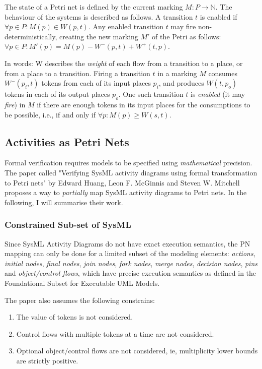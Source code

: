 The state of a Petri net is defined by the current marking \( M : P \rightarrow \mathbb{N} \). The behaviour of the systems is described as follows. A transition \( t \) is enabled if \( \forall p \in P : M(p) \in W(p, t) \). Any enabled transition \(t\) may fire non-deterministically, creating the new marking \( M' \) of the Petri as follows: \( \forall p \in P : M'(p) = M(p) - W^-(p, t) + W^+(t, p) \).

In words: W describes the \emph{weight} of each flow from a transition to a place, or from a place to a transition. Firing a transition \(t\) in a marking \(M\) consumes \(W^-(p_i, t)\) tokens from each of its input places \(p_i\), and produces \(W(t, p_o)\) tokens in each of its output places \(p_o\). One such transition \(t\) is \emph{enabled} (it may \emph{fire}) in \(M\) if there are enough tokens in its input places for the consumptions to be possible, i.e., if and only if \( \forall p : M(p) \ge W(s, t)\).

\subsection{Activities as Petri Nets}\label{ssec:activities-as-petri-nets}

Formal verification requires models to be specified using \emph{mathematical} precision. The paper called "Verifying SysML activity diagrams using formal transformation to Petri nets"\cite{https://doi.org/10.1002/sys.21524} by Edward Huang, Leon F. McGinnis and Steven W. Mitchell proposes a way to \emph{partially} map SysML activity diagrams to Petri nets. In the following, I will summarise their work.

\subsubsection{Constrained Sub-set of SysML}\label{ssec:sysml_assumptions}

Since SysML Activity Diagrams do not have exact execution semantics\cite{euml}, the PN mapping can only be done for a limited subset of the modeling elements: \emph{actions}, \emph{initial nodes}, \emph{final nodes}, \emph{join nodes}, \emph{fork nodes}, \emph{merge nodes}, \emph{decision nodes}, \emph{pins} and \emph{object/control flows}, which have precise execution semantics as defined in the Foundational Subset for Executable UML Models.\cite{fuml}

The paper also assumes the following constrains:

\begin{enumerate}
	\item The value of tokens is not considered.
	\item Control flows with multiple tokens at a time are not considered.
	\item Optional object/control flows are not considered, ie, multiplicity lower bounds are strictly positive.
\end{enumerate}

